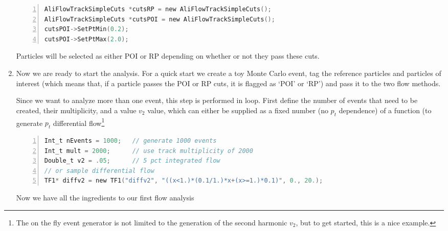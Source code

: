 \documentclass[a4paper]{book}
\numberwithin{equation}{subsection}
\begin{document}
\begin{enumerate}
	\begin{lstlisting}[language=C, numbers=left]
AliFlowTrackSimpleCuts *cutsRP = new AliFlowTrackSimpleCuts();
AliFlowTrackSimpleCuts *cutsPOI = new AliFlowTrackSimpleCuts();
cutsPOI->SetPtMin(0.2);
cutsPOI->SetPtMax(2.0);	\end{lstlisting}
Particles will be selected as either POI or RP depending on whether or not they pass these cuts.
        \item Now we are ready to start the analysis. For a quick start we create a toy Monte Carlo event, tag the reference particles and particles of interest (which means that, if a particle passes the POI or RP cuts, it is flagged as `POI' or `RP')  and pass it to the two flow methods. 
	
	Since we want to analyze more than one event, this step is performed in loop. First define the number of events that need to be created, their multiplicity, and a value $v_2$ value, which can either be supplied as a fixed number (no $p_t$ dependence) of a function (to generate $p_t$ differential flow\footnote{The on the fly event generator is not limited to the generation of the second harmonic $v_2$, but to get started, this is a nice example.}
	
	\begin{lstlisting}[language=C, numbers=left]
Int_t nEvents = 1000;	// generate 1000 events
Int_t mult = 2000;		// use track multiplicity of 2000
Double_t v2 = .05;		// 5 pct integrated flow
// or sample differential flow
TF1* diffv2 = new TF1("diffv2", "((x<1.)*(0.1/1.)*x+(x>=1.)*0.1)", 0., 20.); \end{lstlisting}
	
Now we have all the ingredients to our first flow analysis	
	

\end{enumerate}
\end{document}
